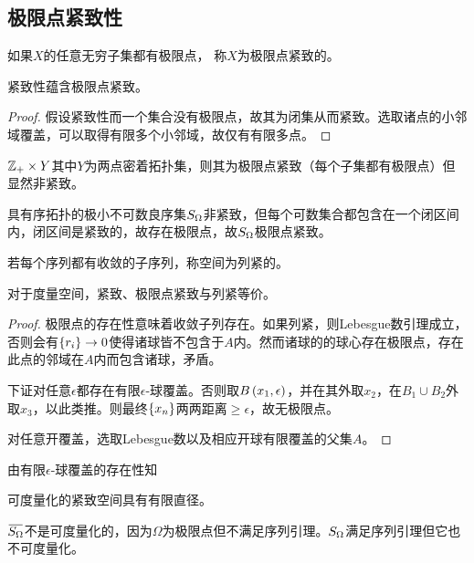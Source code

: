 \documentclass{ctexrep}
\begin{document}
  \subsection{极限点紧致性}
  \begin{definition}
    如果$X$的任意无穷子集都有极限点， 称$X$为极限点紧致的。
  \end{definition}
  \begin{theorem}
    \label{thm:metriccompactimplies}
    紧致性蕴含极限点紧致。
  \end{theorem}
  \begin{proof}
    假设紧致性而一个集合没有极限点，故其为闭集从而紧致。选取诸点的小邻域覆盖，可以取得有限多个小邻域，故仅有有限多点。
  \end{proof}
  \begin{ex}
    $\mathbb{Z}_+\times Y$其中$Y$为两点密着拓扑集，则其为极限点紧致（每个子集都有极限点）但显然非紧致。
  \end{ex}
  \begin{ex}
    具有序拓扑的极小不可数良序集$S_\Omega$非紧致，但每个可数集合都包含在一个闭区间内，闭区间是紧致的，故存在极限点，故$S_\Omega$极限点紧致。
  \end{ex}
  \begin{definition}
    若每个序列都有收敛的子序列，称空间为列紧的。
  \end{definition}
  \begin{theorem}
    \label{thm:metriccompacteq}
    对于度量空间，紧致、极限点紧致与列紧等价。
  \end{theorem}
  \begin{proof}
    极限点的存在性意味着收敛子列存在。如果列紧，则Lebesgue数引理成立，否则会有$\left\{r_i\right\}\rightarrow 0$使得诸球皆不包含于$A$内。然而诸球的的球心存在极限点，存在此点的邻域在$A$内而包含诸球，矛盾。
    \par
    下证对任意$\epsilon$都存在有限$\epsilon$-球覆盖。否则取$B\left(x_1,\epsilon\right)$，并在其外取$x_2$，在$B_1\cup B_2$外取$x_3$，以此类推。则最终$\left\{x_n\right\}$两两距离$\ge\epsilon$，故无极限点。
    \par
    对任意开覆盖，选取Lebesgue数以及相应开球有限覆盖的父集$A$。
  \end{proof}
  由有限$\epsilon$-球覆盖的存在性知
  \begin{corollary}
    可度量化的紧致空间具有有限直径。
  \end{corollary}
  \begin{ex}
    $\clo{\muc}$不是可度量化的，因为$\Omega$为极限点但不满足序列引理。$S_\Omega$满足序列引理但它也不可度量化。
  \end{ex}
\end{document}
